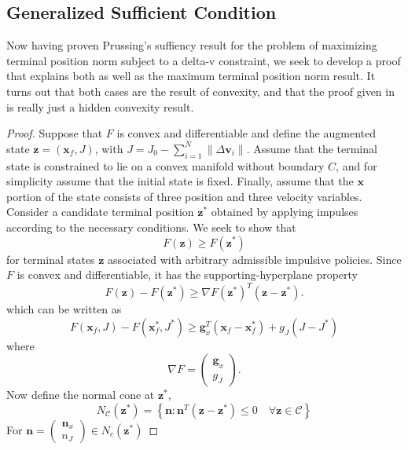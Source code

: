 \documentclass[letterpaper, 10 pt, conference]{ieeeconf}  %
\begin{document}
\subsection{Generalized Sufficient Condition} 
Now having proven Prussing's suffiency result for the problem of maximizing terminal position norm subject to a delta-v constraint, we seek to develop a proof that explains both \cite{Prussing1995} as well as the maximum terminal position norm result. It turns out that both cases are the result of convexity, and that the proof given in \cite{Prussing1995} is really just a hidden convexity result. 

\begin{proof}


Suppose that \(F\) is convex and differentiable and define the augmented state $\boldsymbol{z}=(\mathbf{x}_f,J)$, with $J = J_0 - \sum_{i=1}^N \| \Delta\boldsymbol{v}_i \|$. Assume that the terminal state is constrained to lie on a convex manifold without boundary $C$, and for simplicity assume that the initial state is fixed. Finally, assume that the $\mathbf{x}$ portion of the state consists of three position and three velocity variables. Consider a candidate
terminal position \(\boldsymbol{z}^*\) obtained by applying impulses according to the necessary conditions. We seek to show that
\[
F(\boldsymbol{z}) \geq F(\boldsymbol{z}^*)
\]
for terminal states \(\boldsymbol{z}\) associated with arbitrary admissible impulsive policies. Since \(F\) is convex and differentiable, it has the supporting-hyperplane
property
\[
F(\boldsymbol{z})-F(\boldsymbol{z}^*)
\geq
\nabla F(\boldsymbol{z}^*)^T(\boldsymbol{z}-\boldsymbol{z}^*).
\]
which can be written as 
\begin{equation}
F(\mathbf{x}_f,J)-F(\mathbf{x}_f^*,J^*)
\geq
\boldsymbol{g}_x^T(\mathbf{x}_f-\mathbf{x}_f^*)+g_J(J-J^*)
\end{equation}
where
\[
\nabla F=
\begin{pmatrix}
\boldsymbol{g}_x\\
g_J
\end{pmatrix}.
\]
Now define the normal cone at $\boldsymbol{z}^*$,
\begin{equation}
N_{\mathcal C}(\boldsymbol{z}^*)
=
\left\{
\boldsymbol{n}:\boldsymbol{n}^T(\boldsymbol{z}-\boldsymbol{z}^*)\leq 0
\quad
\forall \boldsymbol{z}\in\mathcal C
\right\}
\end{equation}
For $\boldsymbol{n}= \begin{pmatrix} \boldsymbol{n}_x\\ n_J \end{pmatrix} \in N_c(\boldsymbol{z}^*)$


\end{proof}
\end{document}
